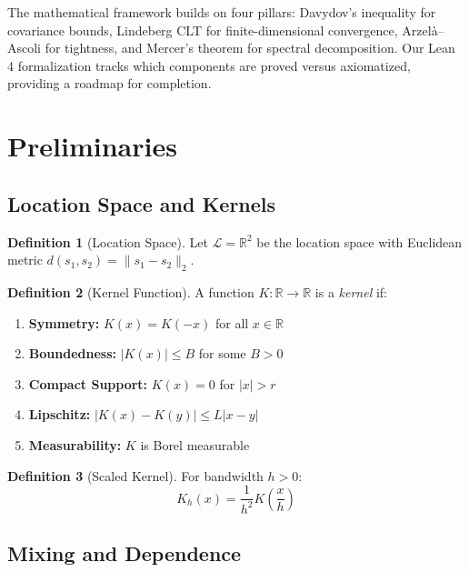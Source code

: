 \documentclass[final,3p,twocolumn,times,authoryear]{elsarticle}
\theoremstyle{definition}
\newtheorem{definition}{Definition}[section]
\begin{document}
The mathematical framework builds on four pillars: Davydov's inequality for covariance bounds, Lindeberg CLT for finite-dimensional convergence, Arzelà--Ascoli for tightness, and Mercer's theorem for spectral decomposition. Our Lean 4 formalization tracks which components are proved versus axiomatized, providing a roadmap for completion.

\section{Preliminaries}
\label{sec:prelim}

\subsection{Location Space and Kernels}

\begin{definition}[Location Space]
Let $\mathcal{L} = \mathbb{R}^2$ be the location space with Euclidean metric $d(s_1, s_2) = \|s_1 - s_2\|_2$.
\end{definition}

\begin{definition}[Kernel Function]
\label{def:kernel}
A function $K: \mathbb{R} \to \mathbb{R}$ is a \emph{kernel} if:
\begin{enumerate}
    \item[\textbf{(K1)}] \textbf{Symmetry:} $K(x) = K(-x)$ for all $x \in \mathbb{R}$
    \item[\textbf{(K2)}] \textbf{Boundedness:} $|K(x)| \leq B$ for some $B > 0$
    \item[\textbf{(K3)}] \textbf{Compact Support:} $K(x) = 0$ for $|x| > r$
    \item[\textbf{(K4)}] \textbf{Lipschitz:} $|K(x) - K(y)| \leq L|x - y|$
    \item[\textbf{(K5)}] \textbf{Measurability:} $K$ is Borel measurable
\end{enumerate}
\end{definition}

\begin{definition}[Scaled Kernel]
For bandwidth $h > 0$:
\begin{equation}
K_h(x) = \frac{1}{h^2} K\left(\frac{x}{h}\right)
\end{equation}
\end{definition}

\subsection{Mixing and Dependence}
\end{document}
